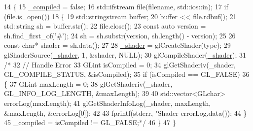 \begin{DoxyCode}
14 \{
15     \mbox{\hyperlink{classEngine_1_1Components_1_1Graphics_1_1Shader_a675c32a04d4eb33117d6ff2b988e13b5}{\_compiled}} = \textcolor{keyword}{false};
16     std::ifstream file(filename, std::ios::in);
17     \textcolor{keywordflow}{if} (file.is\_open())
18     \{
19         std::stringstream buffer;
20         buffer << file.rdbuf();
21         std::string sh = buffer.str();
22         file.close();
23         \textcolor{keyword}{const} \textcolor{keyword}{auto} version = sh.find\_first\_of(\textcolor{charliteral}{'#'});
24         sh = sh.substr(version, sh.length() - version);
25 
26         \textcolor{keyword}{const} \textcolor{keywordtype}{char}* shader = sh.data();
27 
28         \mbox{\hyperlink{classEngine_1_1Components_1_1Graphics_1_1Shader_a4494d72a65715eb9f02e06a533684872}{\_shader}} = glCreateShader(type);
29         glShaderSource(\mbox{\hyperlink{classEngine_1_1Components_1_1Graphics_1_1Shader_a4494d72a65715eb9f02e06a533684872}{\_shader}}, 1, &shader, NULL);
30         glCompileShader(\mbox{\hyperlink{classEngine_1_1Components_1_1Graphics_1_1Shader_a4494d72a65715eb9f02e06a533684872}{\_shader}});
31         \textcolor{comment}{/*}
32 \textcolor{comment}{        // Handle Error}
33 \textcolor{comment}{        GLint isCompiled = 0;}
34 \textcolor{comment}{        glGetShaderiv(\_shader, GL\_COMPILE\_STATUS, &isCompiled);}
35 \textcolor{comment}{        if (isCompiled == GL\_FALSE)}
36 \textcolor{comment}{        \{}
37 \textcolor{comment}{            GLint maxLength = 0;}
38 \textcolor{comment}{            glGetShaderiv(\_shader, GL\_INFO\_LOG\_LENGTH, &maxLength);}
39 \textcolor{comment}{}
40 \textcolor{comment}{            std::vector<GLchar> errorLog(maxLength);}
41 \textcolor{comment}{            glGetShaderInfoLog(\_shader, maxLength, &maxLength, &errorLog[0]);}
42 \textcolor{comment}{}
43 \textcolor{comment}{            fprintf(stderr, "Shader %
       errorLog.data());}
44 \textcolor{comment}{        \}}
45 \textcolor{comment}{        \_compiled = isCompiled != GL\_FALSE;*/}
46     \}
47 \}
\end{DoxyCode}
\mbox{\label{classEngine_1_1Components_1_1Graphics_1_1Shader_af0014ee53239fa71cddfae086d0a1781}} 

